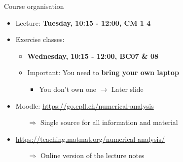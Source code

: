 \begin{frame}{Course organisation}
    \begin{itemize}
        \item \alert{Lecture}: \textbf{Tuesday, 10:15 - 12:00, CM 1 4}
        \vspace{1.5em}
        \item \alert{Exercise classes}:
            \begin{itemize}
                \item \textbf{Wednesday, 10:15 - 12:00, BC07 \& 08}
                \item Important: You need to \textbf{bring your own laptop}
                    \begin{itemize}
                        \vspace{-0.2em}
                        \item You don't own one $\rightarrow$ Later slide
                    \end{itemize}
            \end{itemize}
        \vspace{1.5em}
        \item \alert{Moodle:} \url{https://go.epfl.ch/numerical-analysis}
            \begin{itemize}
                \item[$\Rightarrow$] Single source for all information and material
            \end{itemize}
        \vspace{1.5em}
        \item \url{https://teaching.matmat.org/numerical-analysis/}
            \begin{itemize}
                \item[$\Rightarrow$] Online version of the \alert{lecture notes}
            \end{itemize}
    \end{itemize}
\end{frame}

